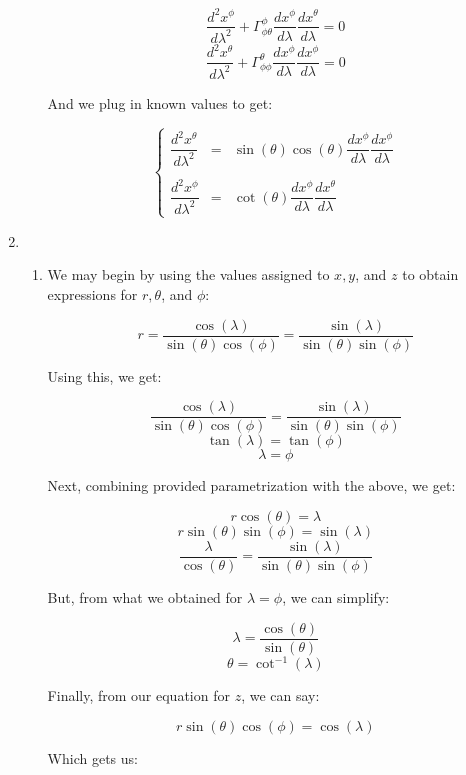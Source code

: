 \begin{enumerate}
\begin{enumerate}
        $$\frac{d^2x^{\phi}}{d\lambda^2}+\Gamma^{\phi}_{\phi\theta}\frac{dx^{\phi}}{d\lambda}\frac{dx^{\theta}}{d\lambda}=0$$
        $$\frac{d^2x^{\theta}}{d\lambda^2}+\Gamma^{\theta}_{\phi\phi}\frac{dx^{\phi}}{d\lambda}\frac{dx^{\phi}}{d\lambda}=0$$

        And we plug in known values to get:

        $$\boxed{\left\{\begin{array}{lll} \dfrac{d^2x^{\theta}}{d\lambda^2} &= &\sin(\theta)\cos(\theta)\dfrac{dx^{\phi}}{d\lambda}\dfrac{dx^{\phi}}{d\lambda}\\\\ \dfrac{d^2x^{\phi}}{d\lambda^2} &= &\cot(\theta)\dfrac{dx^{\phi}}{d\lambda}\dfrac{dx^{\theta}}{d\lambda}\end{array}}$$

    \end{enumerate}

  \item

    \begin{enumerate}

      \item 

        We may begin by using the values assigned to $x,y$, and $z$ to obtain expressions for $r,\theta$, and $\phi$:

        $$r=\frac{\cos(\lambda)}{\sin(\theta)\cos(\phi)}=\frac{\sin(\lambda)}{\sin(\theta)\sin(\phi)}$$

        Using this, we get:

        $$\frac{\cos(\lambda)}{\sin(\theta)\cos(\phi)}=\frac{\sin(\lambda)}{\sin(\theta)\sin(\phi)}$$
        $$\tan(\lambda)=\tan(\phi)$$
        $$\lambda=\phi$$

        Next, combining provided parametrization with the above, we get:

        $$r\cos(\theta)=\lambda$$
        $$r\sin(\theta)\sin(\phi)=\sin(\lambda)$$
        $$\frac{\lambda}{\cos(\theta)}=\frac{\sin(\lambda)}{\sin(\theta)\sin(\phi)}$$

        But, from what we obtained for $\lambda=\phi$, we can simplify:

        $$\lambda=\frac{\cos(\theta)}{\sin(\theta)}$$
        $$\theta=\cot^{-1}\left( \lambda \right)$$

        Finally, from our equation for $z$, we can say:

        $$r\sin(\theta)\cos(\phi)=\cos(\lambda)$$

        Which gets us:


\end{enumerate}
\end{enumerate}
